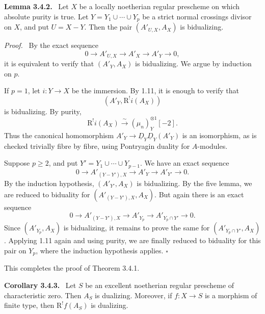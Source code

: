 \documentclass[11pt]{article}
\theoremstyle{plain}
\theoremstyle{definition}
\theoremstyle{remark}
\newenvironment{statement}[1]{\par\medskip\noindent\textbf{#1.}\ }{\par\medskip}
\newenvironment{prooftext}{\par\noindent\textit{Proof.}\ }{\par\medskip}
\newcommand{\R}{\mathrm R}
\newcommand{\qedtext}{\hfill$\square$}
\begin{document}
\begin{statement}{Lemma 3.4.2}
Let $X$ be a locally noetherian regular prescheme on which absolute purity is true. Let $Y=Y_1\cup\cdots\cup Y_p$ be a strict normal crossings divisor on $X$, and put $U=X-Y$. Then the pair $(A'_{U,X},A_X)$ is bidualizing.
\end{statement}

\begin{prooftext}
By the exact sequence
\[
   0\longrightarrow A'_{U,X}\longrightarrow A'_X\longrightarrow A'_Y\longrightarrow0,
\]
it is equivalent to verify that $(A'_Y,A_X)$ is bidualizing. We argue by induction on $p$.

If $p=1$, let $i:Y\to X$ be the immersion. By 1.11, it is enough to verify that
\[
   (A'_Y,\R^!i(A_X))
\]
is bidualizing. By purity,
\[
   \R^!i(A_X)\xrightarrow{\sim}(\mu_n)^{\otimes1}_Y[-2].
\]
Thus the canonical homomorphism $A'_Y\to\underline D_Y\underline D_Y(A'_Y)$ is an isomorphism, as is checked trivially fibre by fibre, using Pontryagin duality for $A$-modules.

Suppose $p\ge2$, and put $Y'=Y_1\cup\cdots\cup Y_{p-1}$. We have an exact sequence
\[
   0\longrightarrow A'_{(Y-Y'),X}\longrightarrow A'_Y\longrightarrow A'_{Y'}\longrightarrow0.
\]
By the induction hypothesis, $(A'_{Y'},A_X)$ is bidualizing. By the five lemma, we are reduced to biduality for $(A'_{(Y-Y'),X},A_X)$. But again there is an exact sequence
\[
   0\longrightarrow A'_{(Y-Y'),X}\longrightarrow A'_{Y_p}\longrightarrow A'_{Y_p\cap Y'}\longrightarrow0.
\]
Since $(A'_{Y_p},A_X)$ is bidualizing, it remains to prove the same for $(A'_{Y_p\cap Y'},A_X)$. Applying 1.11 again and using purity, we are finally reduced to biduality for this pair on $Y_p$, where the induction hypothesis applies. \qedtext
\end{prooftext}

This completes the proof of Theorem 3.4.1.

\begin{statement}{Corollary 3.4.3}
Let $S$ be an excellent noetherian regular prescheme of characteristic zero. Then $A_S$ is dualizing. Moreover, if $f:X\to S$ is a morphism of finite type, then $\R^!f(A_S)$ is dualizing.
\end{statement}
\end{document}
